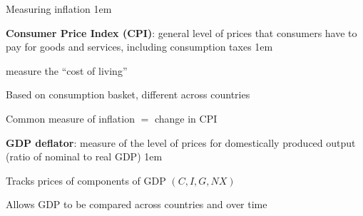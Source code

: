 \documentclass[11pt,aspectratio=43,usenames,dvipsnames]{beamer}
\let\olditemize=\itemize
\let\endolditemize=\enditemize
\renewenvironment{itemize}{\olditemize \itemsep1em}{\endolditemize}
\let\oldenumerate=\enumerate
\let\endoldenumerate=\endenumerate
\renewenvironment{enumerate}{\oldenumerate \itemsep1em}{ \endoldenumerate}
\theoremstyle{definition}
\begin{document}
\begin{frame}{Measuring inflation}
\label{slide:Measuring_inflation}
    \begin{enumerate}
        \item \textbf{Consumer Price Index (CPI)}: general level of prices that consumers have to pay for goods and services, including consumption taxes
        \begin{itemize}
            \item measure the ``cost of living''
            \item Based on \alert{consumption basket}, different across countries
            \item Common measure of inflation $ = $ change in CPI
        \end{itemize}
        \item \textbf{GDP deflator}: measure of the level of prices for domestically produced output (ratio of nominal to real GDP)
        \begin{itemize}
            \item Tracks prices of components of GDP $(C, I, G, NX)$
            \item Allows GDP to be compared across countries and over time
        \end{itemize}

    \end{enumerate}


\end{frame}



%
%
\end{document}
